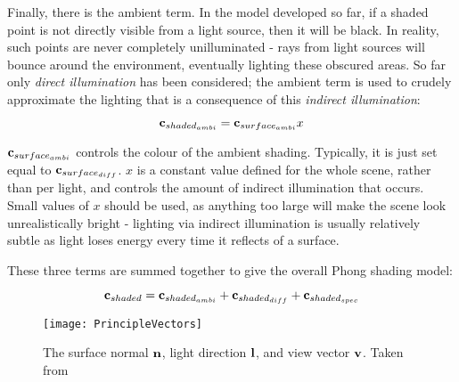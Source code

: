 Finally, there is the ambient term. In the model developed so far, if a shaded point is not directly visible from a light source, then it will be black. In reality, such points are never completely unilluminated - rays from light sources will bounce around the environment, eventually lighting these obscured areas. So far only \textit{direct illumination} has been considered; the ambient term is used to crudely approximate the lighting that is a consequence of this \textit{indirect illumination}:

\vspace{-0.3cm}

\begin{equation} \label{eq:BlinnPhongAmbient}
	\mathbf{c}_{shaded_{ambi}} = \mathbf{c}_{surface_{ambi}}x
\end{equation}

\begin{math}\mathbf{c}_{surface_{ambi}}\end{math} controls the colour of the ambient shading. Typically, it is just set equal to \begin{math}\mathbf{c}_{surface_{diff}}\end{math}. \begin{math}x\end{math} is a constant value defined for the whole scene, rather than per light, and controls the amount of indirect illumination that occurs. Small values of \begin{math}x\end{math} should be used, as anything too large will make the scene look unrealistically bright - lighting via indirect illumination is usually relatively subtle as light loses energy every time it reflects of a surface.

These three terms are summed together to give the overall Phong shading model:

\vspace{-0.3cm}

\begin{equation}
	\mathbf{c}_{shaded} = \mathbf{c}_{shaded_{ambi}} + \mathbf{c}_{shaded_{diff}} + \mathbf{c}_{shaded_{spec}}
\end{equation}

\vspace{-0.3cm}

\begin{figure}[h]
	\centering
	\texttt{[image: PrincipleVectors]}
	\caption{The surface normal \begin{math}\mathbf{n}\end{math}, light direction \begin{math}\mathbf{l}\end{math}, and view vector \begin{math}\mathbf{v}\end{math}. Taken from~\cite{RTR4}}
	\label{fig:PrincipleVectors}
\end{figure}


